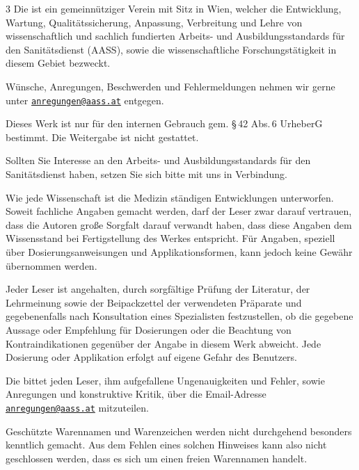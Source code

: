 \documentclass[
ngerman,
paper=a4,
asymmetric,
fontsize=9pt,
draft=false,
parskip=half,
bibtotocnumbered,
footnotes=multiple,
toc=flat,
]{scrbook}
\begin{document}
\begin{WidePar}
\begin{multicols}{3}
\noindent{}Die {\ARGEAASS} ist ein gemeinnütziger Verein mit Sitz in Wien,
welcher die Entwicklung, Wartung, Qualitätssicherung, Anpassung, Verbreitung und Lehre von
wissenschaftlich und sachlich fundierten Arbeits- und Ausbildungsstandards für
den Sanitätsdienst (AASS), sowie die wissenschaftliche Forschungstätigkeit in
diesem Gebiet bezweckt.


\noindent{}Wünsche, Anregungen, Beschwerden und Fehlermeldungen nehmen wir
gerne unter 
\href{mailto:anregungen@aass.at}{\nolinkurl{anregungen@aass.at}} entgegen.


\noindent{}Dieses Werk ist nur für den internen Gebrauch gem. §\,42
Abs.\,6 UrheberG bestimmt. Die Weitergabe ist nicht
gestattet. 

Sollten Sie Interesse an den Arbeits- und
Ausbildungsstandards für den Sanitätsdienst haben, setzen
Sie sich bitte mit uns in Verbindung.


\noindent{}Wie jede Wissenschaft ist die Medizin ständigen Entwicklungen
unterworfen. Soweit fachliche Angaben gemacht werden, darf der Leser
zwar darauf vertrauen, dass die Autoren große Sorgfalt
darauf verwandt haben, dass diese Angaben dem Wissensstand bei
Fertigstellung des Werkes entspricht. Für Angaben, speziell
über Dosierungsanweisungen und Applikationsformen, kann jedoch
keine Gewähr übernommen werden. 

Jeder Leser ist angehalten, durch
sorgfältige Prüfung der Literatur, der Lehrmeinung so\-wie der
Beipackzettel der verwendeten Präparate und gegebenenfalls nach
Konsultation eines Spezialisten festzustellen, ob die gegebene
Aussage oder Empfehlung für Dosierungen oder die Beachtung von
Kontraindikationen gegenüber der Angabe in diesem
Werk abweicht. Jede Dosierung oder Applikation erfolgt
auf eigene Gefahr des Benutzers. 

Die {\ARGEAASS} bittet jeden Leser, ihm aufgefallene Ungenauigkeiten und
Fehler, sowie Anregungen und konstruktive Kritik, über die Email-Adresse
\href{mailto:anregungen@aass.at}{\nolinkurl{anregungen@aass.at}} mitzuteilen.

Geschützte Warennamen und Warenzeichen werden nicht durchgehend besonders
kenntlich gemacht. Aus dem Fehlen eines solchen Hinweises kann also
nicht geschlossen werden, dass es sich um einen freien Warennamen
handelt.


\end{multicols}
\end{WidePar}
\end{document}
